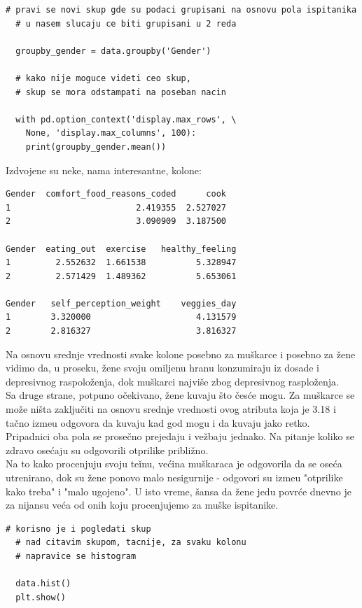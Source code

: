 \documentclass[12pt,a4paper]{article}
\begin{document}
\begin{lstlisting}[mathescape=true]
  # pravi se novi skup gde su podaci grupisani na osnovu pola ispitanika
  # u nasem slucaju ce biti grupisani u 2 reda

  groupby_gender = data.groupby('Gender')

  # kako nije moguce videti ceo skup, 
  # skup se mora odstampati na poseban nacin

  with pd.option_context('display.max_rows', \
    None, 'display.max_columns', 100):
    print(groupby_gender.mean())
\end{lstlisting}

Izdvojene su neke, nama interesantne, kolone:
\begin{verbatim}   
Gender  comfort_food_reasons_coded      cook  
1                         2.419355  2.527027   
2                         3.090909  3.187500 
        
Gender  eating_out  exercise   healthy_feeling 
1         2.552632  1.661538          5.328947
2         2.571429  1.489362          5.653061      
          
Gender   self_perception_weight    veggies_day
1        3.320000                     4.131579
2        2.816327                     3.816327
\end{verbatim}

Na osnovu srednje vrednosti svake kolone posebno za mu\v skarce i posebno za \v zene vidimo da, u proseku, \v zene svoju omiljenu hranu konzumiraju iz dosade i depresivnog raspolo\v zenja, dok mu\v skarci najvi\v se zbog depresivnog rasplo\v zenja. \\
Sa druge strane, potpuno o\v cekivano, \v zene kuvaju \v sto \v ces\' ce mogu. Za mu\v skarce se mo\v ze ni\v sta zaklju\v citi na osnovu srednje vrednosti ovog atributa koja je 3.18 i ta\v cno izme\dj u odgovora da kuvaju kad god mogu i da kuvaju jako retko. \\
Pripadnici oba pola se prose\v cno prejedaju i ve\v zbaju jednako. Na pitanje koliko se zdravo ose\' caju su odgovorili otprilike pribli\v zno. \\
Na to kako procenjuju svoju te\v inu, ve\' cina mu\v skaraca je odgovorila da se ose\' ca utrenirano, dok su \v zene ponovo malo nesigurnije - odgovori su izme\dj u "otprilike kako treba" i "malo ugojeno".
U isto vreme, \v sansa da \v zene jedu povr\' ce dnevno je za nijansu ve\' ca od onih koju procenjujemo za mu\v ske ispitanike.

\begin{lstlisting}[mathescape=true]
  # korisno je i pogledati skup
  # nad citavim skupom, tacnije, za svaku kolonu
  # napravice se histogram

  data.hist()
  plt.show()
\end{lstlisting}
\end{document}

